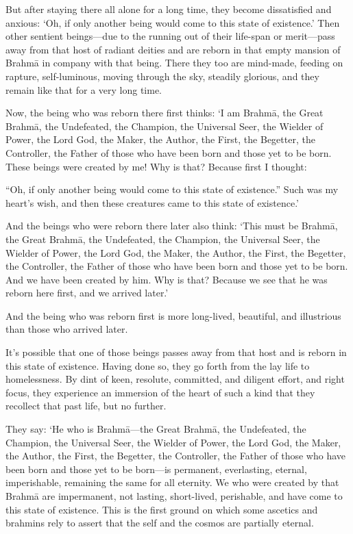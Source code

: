 \documentclass[12pt,openany]{book}%
\begin{document}
But after staying there all alone for a long time, they become dissatisfied and anxious: ‘Oh, if only another being would come to this state of existence.’ Then other sentient beings—due to the running out of their life-span or merit—pass away from that host of radiant deities and are reborn in that empty mansion of \textsanskrit{Brahmā} in company with that being. There they too are mind-made, feeding on rapture, self-luminous, moving through the sky, steadily glorious, and they remain like that for a very long time. 

Now, the being who was reborn there first thinks: ‘I am \textsanskrit{Brahmā}, the Great \textsanskrit{Brahmā}, the Undefeated, the Champion, the Universal Seer, the Wielder of Power, the Lord God, the Maker, the Author, the First, the Begetter, the Controller, the Father of those who have been born and those yet to be born. These beings were created by me! Why is that? Because first I thought: 

“Oh, if only another being would come to this state of existence.” Such was my heart’s wish, and then these creatures came to this state of existence.’ 

And the beings who were reborn there later also think: ‘This must be \textsanskrit{Brahmā}, the Great \textsanskrit{Brahmā}, the Undefeated, the Champion, the Universal Seer, the Wielder of Power, the Lord God, the Maker, the Author, the First, the Begetter, the Controller, the Father of those who have been born and those yet to be born. And we have been created by him. Why is that? Because we see that he was reborn here first, and we arrived later.’ 

And the being who was reborn first is more long-lived, beautiful, and illustrious than those who arrived later. 

It’s possible that one of those beings passes away from that host and is reborn in this state of existence. Having done so, they go forth from the lay life to homelessness. By dint of keen, resolute, committed, and diligent effort, and right focus, they experience an immersion of the heart of such a kind that they recollect that past life, but no further. 

They say: ‘He who is \textsanskrit{Brahmā}—the Great \textsanskrit{Brahmā}, the Undefeated, the Champion, the Universal Seer, the Wielder of Power, the Lord God, the Maker, the Author, the First, the Begetter, the Controller, the Father of those who have been born and those yet to be born—is permanent, everlasting, eternal, imperishable, remaining the same for all eternity. We who were created by that \textsanskrit{Brahmā} are impermanent, not lasting, short-lived, perishable, and have come to this state of existence. This is the first ground on which some ascetics and brahmins rely to assert that the self and the cosmos are partially eternal. 
\end{document}

